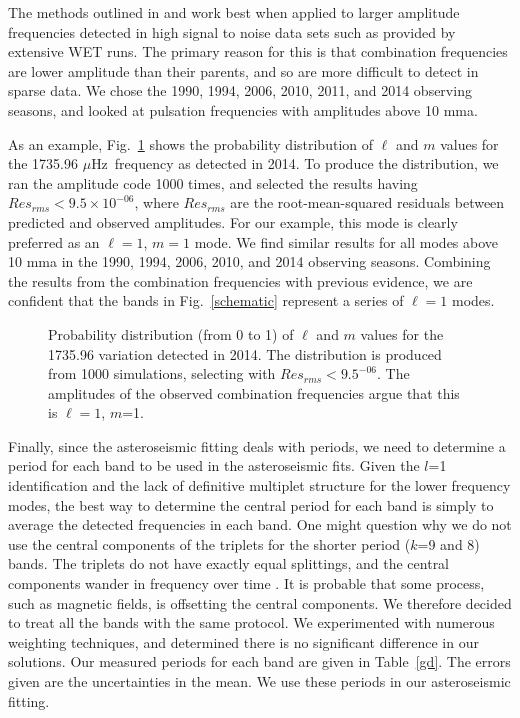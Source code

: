 \documentclass[12pt,preprint]{aastex}
\newcommand{\muHz}{\mbox{$\mu$Hz}}
\begin{document}
The methods outlined in \citet{Provencal12} and \citet{Montgomery10} work best when applied to 
larger amplitude frequencies detected in high signal to noise data sets such as provided by 
extensive WET runs.  The primary reason for this is that combination frequencies are lower 
amplitude than their parents, and so are more difficult to detect in sparse data.  We chose 
the 1990, 1994, 2006, 2010, 2011, and 2014 observing seasons, and looked at pulsation 
frequencies with amplitudes above 10 mma.  

As an example, Fig.~\ref{modeamps} shows the probability distribution of $\ell$ and $m$ 
values for the 1735.96 \muHz\ frequency as detected in 2014. To produce the distribution, we ran
the amplitude code \citep{Montgomery10} 1000 times, and selected the results having $Res_{rms}<9.5\times10^{-06}$, 
where $Res_{rms}$ are the root-mean-squared residuals between predicted and observed amplitudes.  
For our example, this mode is clearly preferred as an $\ell=1$, $m=1$ mode. We find similar results for all
modes above 10 mma in the 1990, 1994, 2006, 2010, and 2014 observing seasons. Combining the results from the 
combination frequencies with previous evidence, we are confident that the bands in Fig.~\ref{schematic} represent
a series of $\ell=1$ modes.  

\begin{figure}
 \caption{Probability distribution (from 0 to 1) of $\ell$ and $m$ values for the 1735.96 variation detected in 
 2014.  The distribution is produced from 1000 simulations, selecting with $Res_{rms}<9.5^{-06}$. 
 The amplitudes of the observed combination frequencies argue that this is $\ell=1$, $m$=1.  
 \label{modeamps}
 }
\end{figure}


Finally, since the asteroseismic fitting deals with periods, we need to determine a period for each band 
to be used in the asteroseismic fits. Given the $l$=1 identification and the lack of definitive multiplet 
structure for the lower frequency modes, the best way to determine the central period for each band is simply 
to average the detected frequencies in each band. One might question why we do not use the central components 
of the triplets for the shorter period ($k$=9 and 8) bands. The triplets do not have exactly equal splittings, 
and the central components wander in frequency over time \citep{Provencal09}. It is probable that some process, 
such as magnetic fields, is offsetting the central components. We therefore decided to treat 
all the bands with the same protocol. We experimented with numerous weighting techniques, and determined 
there is no significant difference in our solutions.  Our measured periods for each band 
are given in Table~\ref{gd}. The errors given are the uncertainties in the mean. We use these periods in 
our asteroseismic fitting. 
\end{document}
